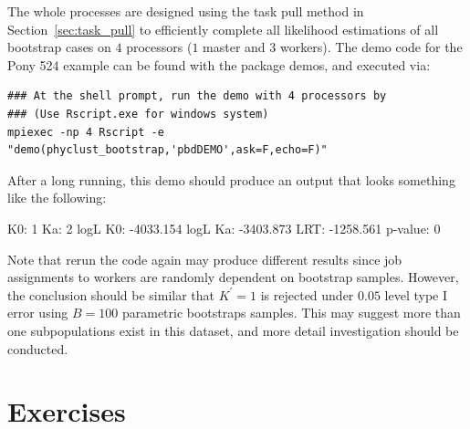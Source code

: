 The whole processes are designed using the task pull method in
Section~\ref{sec:task_pull} to efficiently
complete all likelihood estimations of all bootstrap cases on $4$ processors
($1$ master and $3$ workers).
The demo code for the Pony 524 example can be found with the package demos,
and executed via:
\begin{lstlisting}
### At the shell prompt, run the demo with 4 processors by
### (Use Rscript.exe for windows system)
mpiexec -np 4 Rscript -e "demo(phyclust_bootstrap,'pbdDEMO',ask=F,echo=F)"
\end{lstlisting}

After a long running, this demo should produce an output that looks something
like the following:
\begin{CodeOutput}
K0: 1
Ka: 2
logL K0: -4033.154
logL Ka: -3403.873
LRT: -1258.561
p-value: 0
\end{CodeOutput}
Note that rerun the code again may produce different results since
job assignments to workers are randomly dependent on bootstrap samples.
However, the conclusion should be similar
that $K^\prime = 1$ is rejected under $0.05$ level type I error
using $B = 100$ parametric bootstraps samples.
This may suggest more than one subpopulations exist in this dataset,
and more detail investigation should be conducted.




\section{Exercises}
\label{sec:phyclust_exercise}

